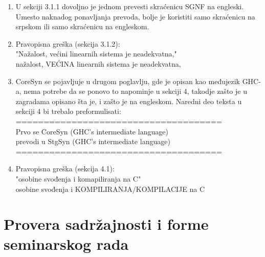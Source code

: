 \documentclass[a4paper]{report}
\begin{document}
\begin{enumerate}
		\item U sekciji 3.1.1 dovoljno je jednom prevesti skraćenicu SGNF na engleski. Umesto naknadog ponavljanja prevoda, bolje je koristiti samo skraćenicu na srpskom ili samo skraćenicu na engleskom.
		
		\item Pravopisna greška (sekcija 3.1.2):\\	
		"Nažalost, većini linearnih sistema je neadekvatna,"\\
		nažalost, VEĆINA linearnih sistema je neadekvatna,
		
		\item CoreSyn se pojavljuje u drugom poglavlju, gde je opisan kao međujezik GHC-a, nema potrebe da se ponovo to napominje u sekciji 4, takodje zašto je u zagradama opisano šta je, i zašto je na engleskom. Naredni deo teksta u sekciji 4 bi trebalo preformulisati:\\
		=====================================\\
		Prvo se CoreSyn (GHC's intermediate language)\\
		prevodi u StgSyn (GHC's intermediate language)\\
		=====================================
		
		\item Pravopisna greška (sekcija 4.1):\\
		"osobine svođenja i komapiliranja na C"\\
		osobine svođenja i KOMPILIRANJA/KOMPILACIJE na C
		
	\end{enumerate}
	
	
	
	
	
	\section{Provera sadržajnosti i forme seminarskog rada}
	
\end{document}

